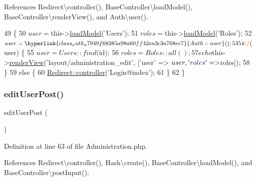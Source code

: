 References Redirect\textbackslash{}controller(), Base\+Controller\textbackslash{}load\+Model(), Base\+Controller\textbackslash{}render\+View(), and Auth\textbackslash{}user().


\begin{DoxyCode}
49                                        \{
50         $user = $this->\hyperlink{class_base_controller_a5fa8890bd3a9d20f5c0cc2377dc49eb1}{loadModel}(\textcolor{stringliteral}{'Users'});
51         $roles = $this->\hyperlink{class_base_controller_a5fa8890bd3a9d20f5c0cc2377dc49eb1}{loadModel}(\textcolor{stringliteral}{'Roles'});
52         $user = \hyperlink{class_auth_a7949f68385a98a60ff42ea3c3a768ec7}{Auth::user}();
53 
54         \textcolor{keywordflow}{if} ($user) \{
55             $user = Users::find($id);
56             $roles = Roles::all();
57             echo $this->\hyperlink{class_base_controller_aa0c49b95cd8e5ff8ff61b4a2c35bf1eb}{renderView}(\textcolor{stringliteral}{'layout/administration\_edit'}, [\textcolor{stringliteral}{'user'} => $user, \textcolor{stringliteral}{'roles'} => 
      $roles]);
58         \}
59         \textcolor{keywordflow}{else} \{
60             \hyperlink{class_redirect_ab7d0d268b6aaa9a5470b7cb8c7eb1b61}{Redirect::controller}(\textcolor{stringliteral}{'Login@index'});
61         \}
62     \}
\end{DoxyCode}
\hypertarget{class_administration_a445a1f2f42c756bf451de087e36b7193}{}\label{class_administration_a445a1f2f42c756bf451de087e36b7193} 
\subsubsection{\texorpdfstring{edit\+User\+Post()}{editUserPost()}}
{\footnotesize\ttfamily edit\+User\+Post (\begin{DoxyParamCaption}{ }\end{DoxyParamCaption})}



Definition at line 63 of file Administration.\+php.



References Redirect\textbackslash{}controller(), Hash\textbackslash{}create(), Base\+Controller\textbackslash{}load\+Model(), and Base\+Controller\textbackslash{}post\+Input().


